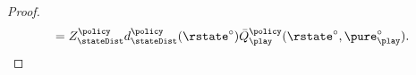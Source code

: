 \begin{proof}
\begin{align*}
		= \normConst{\stateDist}{\policy}\visitDistr{\stateDist}{\policy}(\rstate^\circ)
 \bar{Q}_{\play}^{\policy}(\rstate^\circ,\pure_{\play}^\circ).
\qedhere
\end{align*}
\end{proof}

